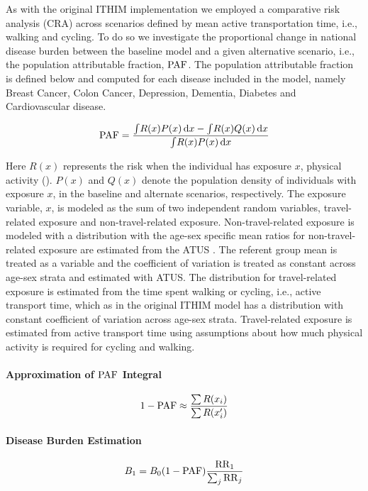 As with the original ITHIM implementation we employed a comparative
risk analysis (CRA) across scenarios defined by mean active
transportation time, i.e., walking and cycling.  To do so we
investigate the proportional change in national disease burden between
the baseline model and a given alternative scenario, i.e., the
population attributable fraction, $\mathrm{PAF}$.  The population attributable
fraction is defined below and computed for each disease included in
the model, namely Breast Cancer, Colon Cancer, Depression, Dementia,
Diabetes and Cardiovascular disease.

\begin{equation}
\mathrm{PAF} = \frac{\int \! R(x)P(x) \, \mathrm{d}x  - \int \! R(x)Q(x) \, \mathrm{d}x}{\int \! R(x)P(x) \, \mathrm{d}x}
\end{equation}

Here $R(x)$ represents the risk when the individual has exposure $x$,
physical activity (\mets).  $P(x)$ and $Q(x)$ denote the population
density of individuals with exposure $x$, in the baseline and
alternate scenarios, respectively.  The exposure variable, $x$, is
modeled as the sum of two independent random variables, travel-related
exposure and non-travel-related exposure.  Non-travel-related exposure
is modeled with a \logNormal{} distribution with the age-sex specific
mean ratios for non-travel-related exposure are estimated from the
ATUS \cite{ATUS}.  The referent group mean is treated as a variable
and the coefficient of variation is treated as constant across age-sex
strata and estimated with ATUS.  The distribution for travel-related
exposure is estimated from the time spent walking or cycling, i.e.,
active transport time, which as in the original ITHIM model has
a \logNormal{} distribution with constant coefficient of variation
across age-sex strata.  Travel-related exposure is estimated from
active transport time using assumptions about how much physical
activity is required for cycling and walking.

\paragraph{Approximation of $\mathrm{PAF}$ Integral}

\begin{equation}
1 - \mathrm{PAF} \approx \frac{\sum R(x_i)}{\sum R(x_i^\prime)}
\end{equation}

\paragraph{Disease Burden Estimation}
\begin{equation}
B_1 = B_0(1-\mathrm{PAF})\frac{\mathrm{RR}_1}{\sum_j \mathrm{RR}_j}
\end{equation}

